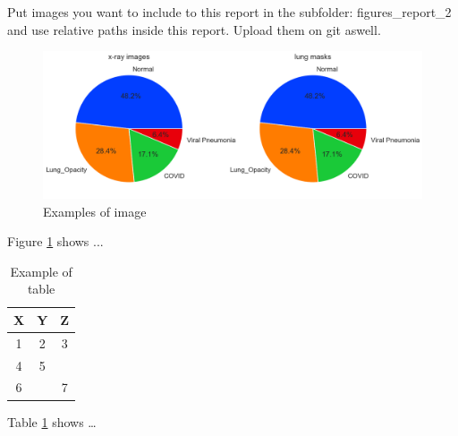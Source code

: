 \documentclass{article}
\begin{document}
Put images you want to include to this report in the subfolder: figures\_report\_2 and use relative paths inside this report.
Upload them on git aswell.

\begin{figure}[ht] %
    \centering
    \includegraphics[width=1.0\linewidth]{../figures/figures_report_2/classes.png}
    \caption{Examples of image}
    \label{fig:example_image}
\end{figure}

Figure \ref{fig:example_image} shows ...


\begin{table}[ht]
    \centering
    \begin{tabular}{|c|c|c|}
        \hline
        \textbf{X} & \textbf{Y} & \textbf{Z} \\ \hline
        1 & 2 & 3 \\ \hline
        4 & 5 &  \\ \hline \hline
        6 &  & 7 \\ \hline
    \end{tabular}
    \caption{Example of table}
    \label{tab:example_table}
\end{table}

Table \ref{tab:example_table} shows \dots
\end{document}
